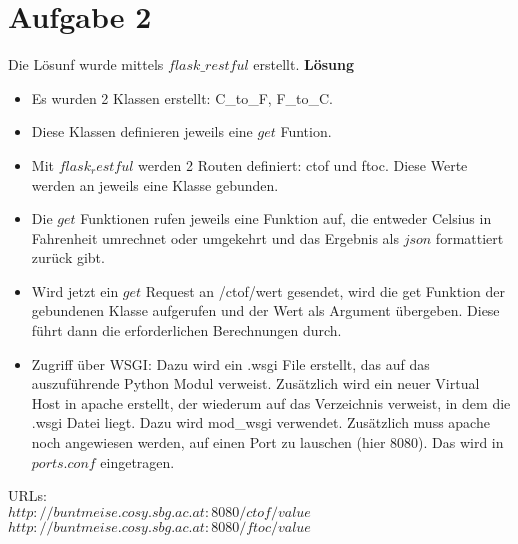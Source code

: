 \documentclass[12pt, a4paper]{report}
\begin{document}
\section*{Aufgabe 2}
Die Lösunf wurde mittels $flask\_restful$ erstellt.
\textbf{Lösung}
\begin{itemize}
	\item Es wurden 2 Klassen erstellt: C\_to\_F, F\_to\_C.
	\item Diese Klassen definieren jeweils eine $get$ Funtion.
	\item Mit $flask_restful$ werden 2 Routen definiert: ctof und ftoc. Diese Werte
	werden an jeweils eine Klasse gebunden.
	\item Die $get$ Funktionen rufen jeweils eine Funktion auf, die entweder Celsius in Fahrenheit umrechnet oder umgekehrt und das Ergebnis als $json$ formattiert zurück
	gibt.
	\item Wird jetzt ein $get$ Request an /ctof/wert gesendet, wird die get Funktion der gebundenen Klasse aufgerufen und der Wert als Argument übergeben. Diese führt dann die erforderlichen Berechnungen durch.
	\item Zugriff über WSGI: Dazu wird ein .wsgi File erstellt, das auf das auszuführende Python Modul verweist. Zusätzlich wird ein neuer Virtual Host in apache erstellt, der wiederum auf das Verzeichnis verweist, in dem die .wsgi Datei liegt. Dazu wird mod\_wsgi verwendet. 
	Zusätzlich muss apache noch angewiesen werden, auf einen Port zu lauschen (hier 8080). Das wird in $ports.conf$ eingetragen.
\end{itemize}

URLs:\\
$http://buntmeise.cosy.sbg.ac.at:8080/ctof/value$ \\
$http://buntmeise.cosy.sbg.ac.at:8080/ftoc/value$
\end{document}
